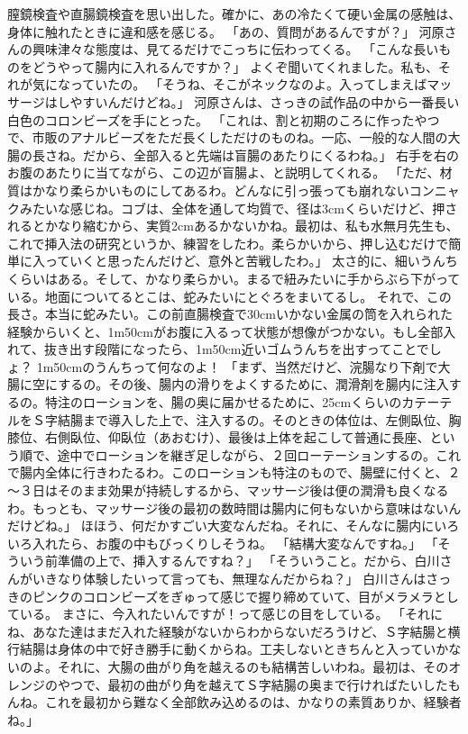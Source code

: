 膣鏡検査や直腸鏡検査を思い出した。確かに、あの冷たくて硬い金属の感触は、身体に触れたときに違和感を感じる。
「あの、質問があるんですが？」
河原さんの興味津々な態度は、見てるだけでこっちに伝わってくる。
「こんな長いものをどうやって腸内に入れるんですか？」
よくぞ聞いてくれました。私も、それが気になっていたの。
「そうね、そこがネックなのよ。入ってしまえばマッサージはしやすいんだけどね。」
河原さんは、さっきの試作品の中から一番長い白色のコロンビーズを手にとった。
「これは、割と初期のころに作ったやつで、市販のアナルビーズをただ長くしただけのものね。一応、一般的な人間の大腸の長さね。だから、全部入ると先端は盲腸のあたりにくるわね。」
右手を右のお腹のあたりに当てながら、この辺が盲腸よ、と説明してくれる。
「ただ、材質はかなり柔らかいものにしてあるわ。どんなに引っ張っても崩れないコンニャクみたいな感じね。コブは、全体を通して均質で、径は3cmくらいだけど、押されるとかなり縮むから、実質2cmあるかないかね。最初は、私も水無月先生も、これで挿入法の研究というか、練習をしたわ。柔らかいから、押し込むだけで簡単に入っていくと思ったんだけど、意外と苦戦したわ。」
太さ的に、細いうんちくらいはある。そして、かなり柔らかい。まるで紐みたいに手からぶら下がっている。地面についてるとこは、蛇みたいにとぐろをまいてるし。
それで、この長さ。本当に蛇みたい。この前直腸検査で30cmいかない金属の筒を入れられた経験からいくと、1m50cmがお腹に入るって状態が想像がつかない。もし全部入れて、抜き出す段階になったら、1m50cm近いゴムうんちを出すってことでしょ？ 1m50cmのうんちって何なのよ！
「まず、当然だけど、浣腸なり下剤で大腸に空にするの。その後、腸内の滑りをよくするために、潤滑剤を腸内に注入するの。特注のローションを、腸の奥に届かせるために、25cmくらいのカテーテルをＳ字結腸まで導入した上で、注入するの。そのときの体位は、左側臥位、胸膝位、右側臥位、仰臥位（あおむけ）、最後は上体を起こして普通に長座、という順で、途中でローションを継ぎ足しながら、２回ローテーションするの。これで腸内全体に行きわたるわ。このローションも特注のもので、腸壁に付くと、２～３日はそのまま効果が持続しするから、マッサージ後は便の潤滑も良くなるわ。もっとも、マッサージ後の最初の数時間は腸内に何もないから意味はないんだけどね。」
ほほう、何だかすごい大変なんだね。それに、そんなに腸内にいろいろ入れたら、お腹の中もびっくりしそうね。
「結構大変なんですね。」
「そういう前準備の上で、挿入するんですね？」
「そういうこと。だから、白川さんがいきなり体験したいって言っても、無理なんだからね？」
白川さんはさっきのピンクのコロンビーズをぎゅって感じで握り締めていて、目がメラメラとしている。
まさに、今入れたいんですが！って感じの目をしている。
「それにね、あなた達はまだ入れた経験がないからわからないだろうけど、Ｓ字結腸と横行結腸は身体の中で好き勝手に動くからね。工夫しないときちんと入っていかないのよ。それに、大腸の曲がり角を越えるのも結構苦しいわね。最初は、そのオレンジのやつで、最初の曲がり角を越えてＳ字結腸の奥まで行ければたいしたもんね。これを最初から難なく全部飲み込めるのは、かなりの素質ありか、経験者ね。」
